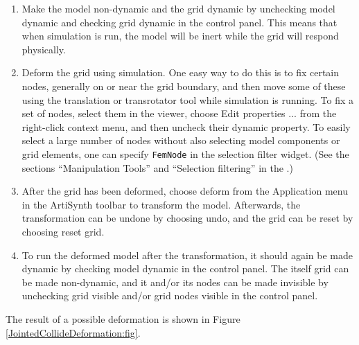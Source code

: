 \begin{enumerate}

\item Make the model non-dynamic and the grid dynamic by unchecking
{\sf model dynamic} and checking {\sf grid dynamic} in the control
panel. This means that when simulation is run, the model will be inert
while the grid will respond physically.

\item Deform the grid using simulation. One easy way to do this is to
fix certain nodes, generally on or near the grid boundary, and then
move some of these using the translation or transrotator
tool while simulation is running. To fix a set of nodes, select
them in the viewer, choose {\sf Edit properties ...} from the
right-click context menu, and then uncheck their {\sf dynamic} property.
To easily select a large number of nodes without also selecting
model components or grid elements, one can specify {\tt FemNode}
in the selection filter widget. (See the sections
``Manipulation Tools'' and ``Selection filtering'' in the
.)

\item After the grid has been deformed, choose {\sf deform} from the
{\sf Application} menu in the ArtiSynth toolbar to transform the model.
Afterwards, the transformation can be undone by choosing {\sf undo},
and the grid can be reset by choosing {\sf reset grid}.

\item To run the deformed model after the transformation, it should
again be made dynamic by checking {\sf model dynamic} in the control
panel.  The itself grid can be made non-dynamic, and it and/or its
nodes can be made invisible by unchecking {\sf grid visible} and/or
{\sf grid nodes visible} in the control panel.

\end{enumerate}

The result of a possible deformation is shown in Figure
\ref{JointedCollideDeformation:fig}.

